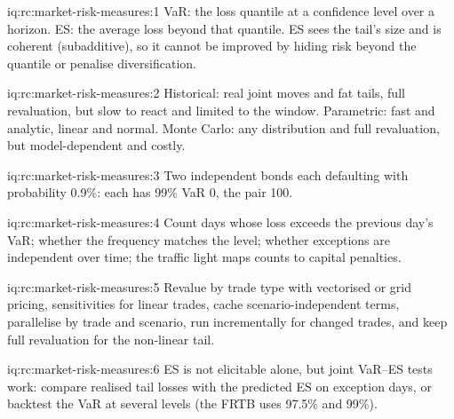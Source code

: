 \begin{solution}{iq:rc:market-risk-measures:1}
VaR: the loss quantile at a confidence level over a horizon. ES: the average loss beyond that
quantile. ES sees the tail's size and is coherent (subadditive), so it cannot be improved by
hiding risk beyond the quantile or penalise diversification.
\end{solution}

\begin{solution}{iq:rc:market-risk-measures:2}
Historical: real joint moves and fat tails, full revaluation, but slow to react and limited to
the window. Parametric: fast and analytic, linear and normal. Monte Carlo: any distribution and
full revaluation, but model-dependent and costly.
\end{solution}

\begin{solution}{iq:rc:market-risk-measures:3}
Two independent bonds each defaulting with probability 0.9\%: each has 99\% VaR 0, the pair 100.
\end{solution}

\begin{solution}{iq:rc:market-risk-measures:4}
Count days whose loss exceeds the previous day's VaR;  whether the frequency matches
the level;  whether exceptions are independent over time; the traffic light
maps counts to capital penalties.
\end{solution}

\begin{solution}{iq:rc:market-risk-measures:5}
Revalue by trade type with vectorised or grid pricing, sensitivities for linear trades, cache
scenario-independent terms, parallelise by trade and scenario, run incrementally for changed
trades, and keep full revaluation for the non-linear tail.
\end{solution}

\begin{solution}{iq:rc:market-risk-measures:6}
ES is not elicitable alone, but joint VaR--ES tests work: compare realised tail losses with the
predicted ES on exception days, or backtest the VaR at several levels
(the FRTB uses 97.5\% and 99\%).
\end{solution}
